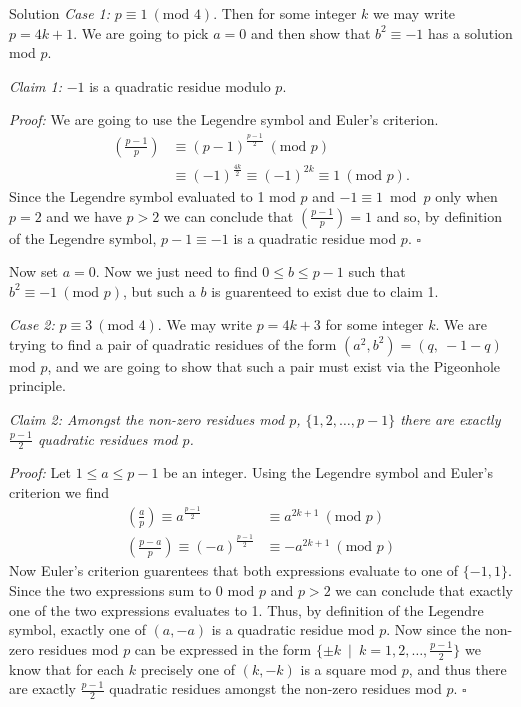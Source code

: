 \documentclass{article}
\begin{document}
\begin{solution}{Solution}
\textit{Case 1:} $p \equiv 1 \ (\text{mod } 4)$. Then for some integer $k$
we may write $p = 4k + 1$. We are going to pick $a=0$ and then
show that $b^2 \equiv -1$ has a solution mod $p$. \vspace{0.2cm}

\textit{Claim 1: } $-1$ is a quadratic residue modulo $p$. \vspace{0.2cm}

\textit{Proof:} We are going to use the Legendre symbol and Euler's
criterion.
\[
\begin{aligned}
\left( \frac{p-1}{p} \right) &\equiv (p-1)^\frac{p-1}{2} \ (\text{mod } p)
\\
&\equiv (-1)^\frac{4k}{2} \equiv (-1)^{2k} \equiv 1 \ (\text{mod } p).
\end{aligned}
\]
Since the Legendre symbol evaluated to 1 mod $p$ and $-1 \equiv 1 \bmod p$
only when $p = 2$ and we have $p > 2$ we can conclude that
$\left(\frac{p-1}{p}\right) = 1$ and so, by definition of the Legendre
symbol, $p-1 \equiv -1$ is a quadratic
residue mod $p$. $\square$
\vspace{0.2cm}

Now set $a=0$. Now we just need to find $0 \leq b \leq p-1$ such that
$b^2 \equiv -1 \ (\text{mod } p)$, but such a $b$ is guarenteed to exist
due to claim 1. \\

{\color{gray} \hline}
\vspace{0.2cm}

\textit{Case 2:} $p \equiv 3 \ (\text{mod } 4)$. We may write $p = 4k + 3$
for some integer $k$. We are trying to find a pair of quadratic residues
of the form $(a^2, b^2) = (q,\ -1 - q)$ mod $p$, and we are going to show
that such a pair must exist via the Pigeonhole principle.
\vspace{0.2cm}

\textit{Claim 2: Amongst the non-zero residues mod $p$,
$\{1,2,\ldots,p-1\}$ there are exactly $\frac{p-1}{2}$ quadratic residues
mod $p$.}
\vspace{0.2cm}

\textit{Proof:} Let $1 \leq a \leq p-1$ be an integer. Using the
Legendre symbol and Euler's criterion we find
\[
\begin{aligned}
\left( \frac{a}{p} \right) \equiv a^\frac{p-1}{2} &\equiv a^{2k + 1} \
(\text{mod } p) \\
\left( \frac{p-a}{p} \right) \equiv (-a)^\frac{p-1}{2} &\equiv -a^{2k+1} \
(\text{mod } p)
\end{aligned}
\]
Now Euler's criterion guarentees that both expressions evaluate to one of
$\{-1,1\}$. Since the two expressions sum to 0 mod $p$ and $p > 2$ we can
conclude that exactly one of the two expressions evaluates to 1. Thus,
by definition of the Legendre symbol,
exactly one of $(a, -a)$ is a quadratic residue mod $p$. Now since the
non-zero residues mod $p$ can be expressed in the form
$\{ \pm k \ \mid \ k=1,2,\ldots,\frac{p-1}{2} \}$ we know that for each
$k$ precisely one of $(k, -k)$ is a square mod $p$, and thus there
are exactly $\frac{p-1}{2}$ quadratic residues amongst the non-zero residues
mod $p$. $\square$
\vspace{0.2cm}


\end{solution}
\end{document}
